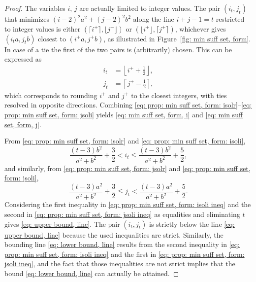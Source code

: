\documentclass[12pt, a4paper]{article}
\newcommand{\tiles}{t} %
\newcommand{\isolr}{i^+}
\newcommand{\jsolr}{j^+}
\begin{document}
\begin{proof}
The variables $i$, $j$ are actually limited to integer values. The pair $(i_\tiles, j_\tiles)$ that minimizes $(i-2)^2 a^2 + (j-2)^2 b^2$ along the line $i+j-1=\tiles$ restricted to integer values is either $(\lceil \isolr \rceil, \lfloor \jsolr \rfloor)$ or $(\lfloor \isolr \rfloor, \lceil \jsolr \rceil)$, whichever gives $(i_\tiles a, j_\tiles b)$ closest to $(\isolr a, \jsolr b)$, as illustrated in Figure~\ref{fig: min suff set, form}. In case of a tie the first of the two pairs is (arbitrarily) chosen. This can be expressed as
\begin{align}
\label{eq: prop: min suff set, form: isoli}
i_\tiles &= \left\lfloor \isolr + \frac 1 2 \right\rfloor, \\
\label{eq: prop: min suff set, form: jsoli}
j_\tiles &= \left\lceil \jsolr - \frac 1 2 \right\rceil,
\end{align}
which corresponds to rounding $\isolr$ and $\jsolr$ to the closest integers, with ties resolved in opposite directions. Combining \eqref{eq: prop: min suff set, form: isolr}--\eqref{eq: prop: min suff set, form: jsoli}
yields \eqref{eq: min suff set, form, i} and \eqref{eq: min suff set, form, j}.

From \eqref{eq: prop: min suff set, form: isolr} and \eqref{eq: prop: min suff set, form: isoli},
\begin{equation}
\label{eq: prop: min suff set, form: isoli ineq}
\frac{(t-3)b^2}{a^2+b^2} + \frac 3 2 < i_\tiles \leq \frac{(t-3)b^2}{a^2+b^2} + \frac 5 2,
\end{equation}
and similarly, from \eqref{eq: prop: min suff set, form: jsolr} and \eqref{eq: prop: min suff set, form: jsoli},
\begin{equation}
\label{eq: prop: min suff set, form: jsoli ineq}
\frac{(t-3)a^2}{a^2+b^2} + \frac 3 2 \leq j_\tiles < \frac{(t-3)a^2}{a^2+b^2} + \frac 5 2.
\end{equation}
Considering the first inequality in \eqref{eq: prop: min suff set, form: isoli ineq} and the second in \eqref{eq: prop: min suff set, form: jsoli ineq} as equalities and eliminating $\tiles$ gives \eqref{eq: upper bound, line}. The pair $(i_\tiles, j_\tiles)$ is strictly below the line \eqref{eq: upper bound, line} because the used inequalities are strict. Similarly, the bounding line \eqref{eq: lower bound, line} results from the second inequality in \eqref{eq: prop: min suff set, form: isoli ineq} and the first in \eqref{eq: prop: min suff set, form: jsoli ineq}, and the fact that those inequalities are not strict implies that the bound \eqref{eq: lower bound, line} can actually be attained.
\end{proof}
\end{document}
